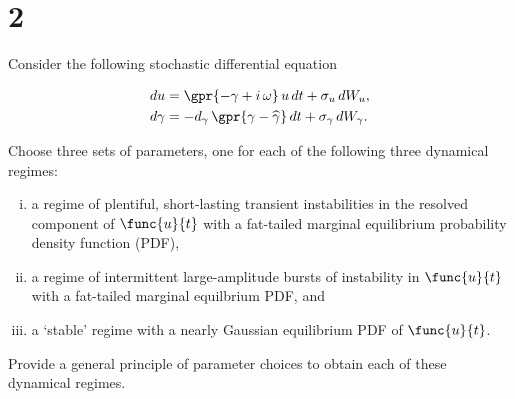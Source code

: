 \section{2}

Consider the following stochastic differential equation 

\begin{subequations}
	\begin{align}
		du &= \gpr{-\gamma + i\,\omega}\,u\,dt + \sigma_u\,dW_{u},\\
		d\gamma &= -d_{\gamma}\,\gpr{\gamma - \widehat{\gamma}}\,dt + \sigma_{\gamma}\,dW_{\gamma}.
	\end{align}
\end{subequations}

Choose three sets of parameters, one for each of the following three dynamical regimes:

\begin{enumerate}[(i)]
	\item a regime of plentiful, short-lasting transient instabilities in the resolved component of $\func{u}{t}$ with a fat-tailed marginal equilibrium probability density function (PDF),

	\item a regime of intermittent large-amplitude bursts of instability in $\func{u}{t}$ with a fat-tailed marginal equilbrium PDF, and
	
	\item a `stable' regime with a nearly Gaussian equilibrium PDF of $\func{u}{t}$.
\end{enumerate}

Provide a general principle of parameter choices to obtain each of these dynamical regimes.

